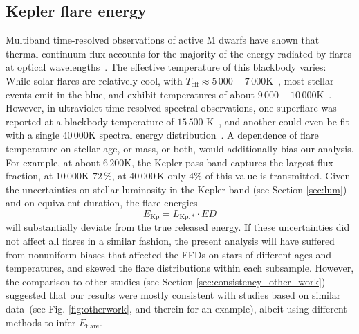 \documentclass{aa}
\begin{document}
\subsection{Kepler flare energy}
\label{sec:en}
Multiband time-resolved observations of active M dwarfs have shown that thermal continuum flux accounts for the majority  of the energy radiated by flares at optical wavelengths~\citep{kowalski2013}.
The effective temperature of this blackbody varies:
While solar flares are relatively cool, with \mbox{$T_\mathrm{eff}\approx5\,000-7\,000 $\;K}~\citep{kleint_solarstellarwlf_2016, kerr_solarstellarwlf_2014, watanabe_solarstellarwlf_2013, namekata_solarstellarwlf_2017}, most stellar events emit in the blue, and exhibit temperatures of about $9\,000-10\,000$\;K~\citep{1992ApJS...78..565H, kretzschmar_sun_2011, davenport_multi-wavelength_2012, shibayama2013}. However, in ultraviolet time resolved spectral observations, one superflare was reported at a blackbody temperature of $15\,500$ K~\citep{loyd2018}, and another could even be fit with a single $40\,000$\;K spectral energy distribution~\citep{froning_40000_2019}.
A dependence of flare temperature on stellar age, or mass, or both, would additionally bias our analysis. For example, at about $6\,200$\;K, the Kepler pass band captures the largest flux fraction, at $10\,000$\;K $72\,\%$, at $40\,000$\,K only $4\%$ of this value is transmitted. 
Given the uncertainties on stellar luminosity in the Kepler band (see Section \ref{sec:lum}) and on equivalent duration, the flare energies
\begin{equation}
E_\mathrm{Kp} = L_\mathrm{Kp,*} \cdot ED
\end{equation}  
will substantially deviate from the true released energy. If these uncertainties did not affect all flares in a similar fashion, the present analysis will have suffered from nonuniform biases that affected the FFDs on stars of different ages and temperatures, and skewed the flare distributions within each subsample. However, the comparison to other studies (see Section \ref{sec:consistency_other_work}) suggested that our results were mostly consistent with studies based on similar data~(see Fig. \ref{fig:otherwork}, and \citealt{lin2019} therein for an example), albeit using different methods to infer $E_\mathrm{flare}$.  
\end{document}

